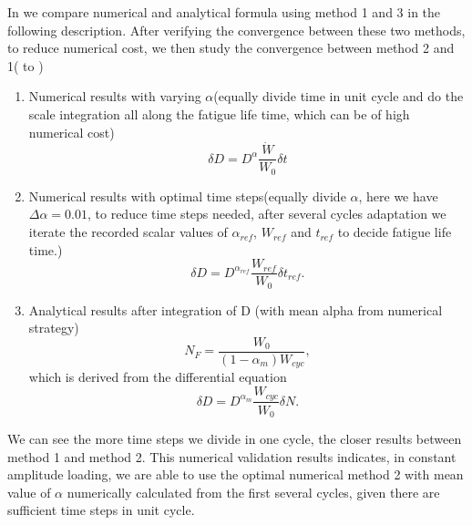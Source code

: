 \newpage
In  we compare numerical and analytical formula using method 1 and 3 in the following description. After verifying the convergence between these two methods, to reduce numerical cost, we then study the convergence between method 2 and 1( to )
\begin{enumerate}
	\item  Numerical results with varying $\alpha$(equally divide time in unit cycle and do the scale integration all along the fatigue life time, which can be of high numerical cost)$$\delta D=D^\alpha\frac{\dot{W}}{W_0}\delta t$$
	\vspace{6pt}
	
	\item  Numerical results with optimal time steps(equally divide $\alpha$, here we have $\Delta\alpha=0.01$, to reduce time steps needed, after several cycles adaptation we iterate the recorded scalar values of $\alpha_{ref}$, $W_{ref}$ and $t_{ref}$ to decide fatigue life time.)
	$$\delta D=D^{\alpha_{ref}}\frac{W_{ref}}{W_0}\delta t_{ref}.$$
	\vspace{6pt}
	
	\item  Analytical results after integration of D (with mean alpha from numerical strategy)$$N_F=\frac{W_0}{( 1-\alpha_m)W_{cyc}},$$ 
	which is derived from the differential equation
	$$\delta D=D^{\alpha_m}\frac{W_{cyc}}{W_0}\delta N.$$
\end{enumerate}	
We can see the more time steps we divide in one cycle, the closer results between method 1 and method 2. This numerical validation results indicates, in constant amplitude loading, we are able to use the optimal numerical method 2 with mean value of $\alpha$ numerically calculated from the first several cycles, given there are sufficient time steps in unit cycle. 

